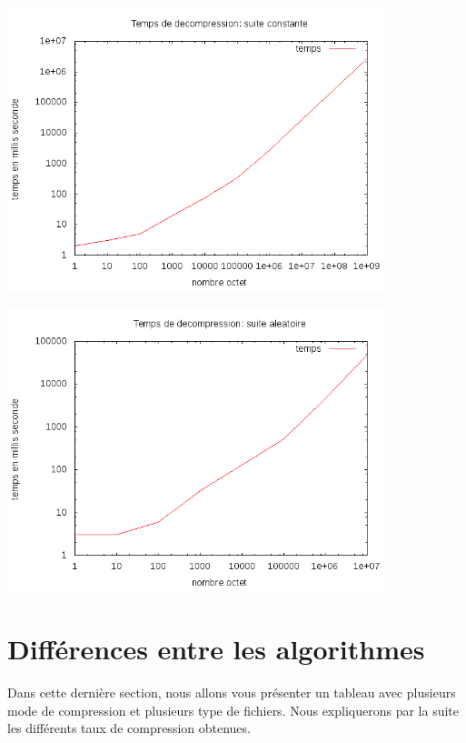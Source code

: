 \documentclass{report}
\begin{document}
\begin{center}
\includegraphics[width=11cm]{tempsDlzC.png}
\end{center}
\begin{center}
\includegraphics[width=11cm]{tempsDlzA.png}
\end{center}

\section*{Différences entre les algorithmes}
Dans cette dernière section, nous allons vous présenter un tableau avec plusieurs mode de compression et plusieurs type de fichiers. 
Nous expliquerons par la suite les différents taux de compression obtenues. 
\end{document}
